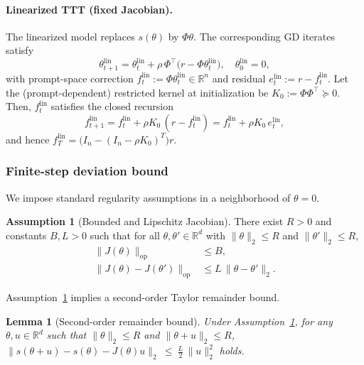 \documentclass{article}
\theoremstyle{plain}
\newtheorem{lemma}[theorem]{Lemma}
\theoremstyle{definition}
\newtheorem{assumption}[theorem]{Assumption}
\theoremstyle{remark}
\begin{document}
\paragraph{Linearized TTT (fixed Jacobian).}
The linearized model replaces $s(\theta)$ by $\Phi\theta$. The corresponding GD iterates satisfy
\begin{equation}
    \theta_{t+1}^{\mathrm{lin}} 
    =\theta_t^{\mathrm{lin}}+\rho\,\Phi^\top\bigl(r-\Phi\theta_t^{\mathrm{lin}}\bigr), 
    \quad
    \theta_0^{\mathrm{lin}}=0,
    \label{eq:app_lin_gd}
\end{equation}
with prompt-space correction $f_t^{\mathrm{lin}}:=\Phi\theta_t^{\mathrm{lin}}\in\mathbb{R}^n$ and residual $e_t^{\mathrm{lin}}:=r-f_t^{\mathrm{lin}}$.
Let the (prompt-dependent) restricted kernel at initialization be $K_0:=\Phi\Phi^\top\succeq 0$. Then, $f_t^{\mathrm{lin}}$ satisfies the closed recursion
\begin{equation}
f_{t+1}^{\mathrm{lin}}=f_t^{\mathrm{lin}}+\rho K_0\,(r-f_t^{\mathrm{lin}})
=f_t^{\mathrm{lin}}+\rho K_0\,e_t^{\mathrm{lin}},
\label{eq:app_lin_kernel_recursion}
\end{equation}
and hence $f_T^{\mathrm{lin}}=\bigl(I_n-(I_n-\rho K_0)^T\bigr)r$.




\subsubsection{Finite-step deviation bound }
\label{app:finite_step_prompt}

We impose standard regularity assumptions in a neighborhood of $\theta=0$.

\begin{assumption}[Bounded and Lipschitz Jacobian]
\label{assump:JL_local_app}
There exist $R>0$ and constants $B,L>0$ such that for all $\theta,\theta'\in\mathbb{R}^d$ with
$\|\theta\|_2\le R$ and $\|\theta'\|_2\le R$,
\begin{align}
\|J(\theta)\|_{\mathrm{op}} &\le B,
\label{eq:app_J_bounded}\\
\|J(\theta)-J(\theta')\|_{\mathrm{op}} &\le L\,\|\theta-\theta'\|_2.
\label{eq:app_J_Lipschitz}
\end{align}
\end{assumption}

Assumption~\ref{assump:JL_local_app} implies a second-order Taylor remainder bound.

\begin{lemma}[Second-order remainder bound]
\label{lem:second_order_remainder_app}
Under Assumption~\ref{assump:JL_local_app}, for any $\theta,u\in\mathbb{R}^d$ such that $\|\theta\|_2\le R$ and $\|\theta+u\|_2\le R$, $\|s(\theta+u)-s(\theta)-J(\theta)u\|_2 \ \le\ \frac{L}{2}\,\|u\|_2^2$ holds.
\end{lemma}
\end{document}
